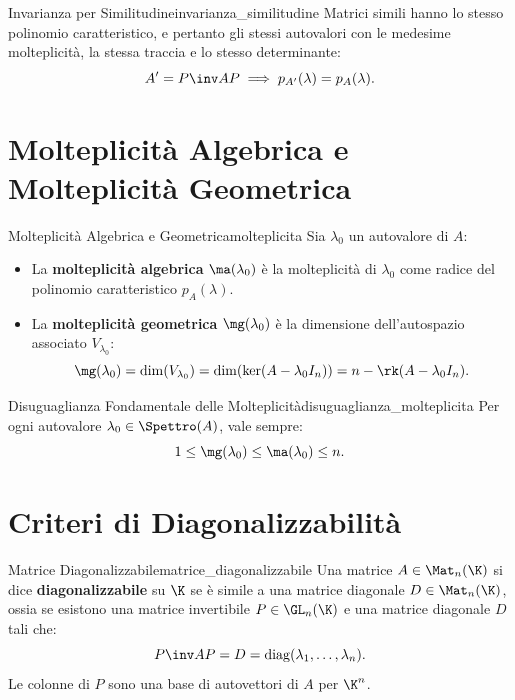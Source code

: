 \begin{proposizione}{Invarianza per Similitudine}{invarianza_similitudine}
Matrici simili hanno lo stesso polinomio caratteristico, e pertanto gli stessi autovalori con le medesime molteplicità, la stessa traccia e lo stesso determinante:
\begin{equation}
    A' = P\inv A P \implies p_{A'}(\lambda) = p_A(\lambda).
\end{equation}
\end{proposizione}

\section{Molteplicità Algebrica e Molteplicità Geometrica}

\begin{definizione}{Molteplicità Algebrica e Geometrica}{molteplicita}
Sia $\lambda_0$ un autovalore di $A$:
\begin{itemize}
    \item La \textbf{molteplicità algebrica} $\ma(\lambda_0)$ è la molteplicità di $\lambda_0$ come radice del polinomio caratteristico $p_A(\lambda)$.
    \item La \textbf{molteplicità geometrica} $\mg(\lambda_0)$ è la dimensione dell'autospazio associato $V_{\lambda_0}$:
    \begin{equation}
        \mg(\lambda_0) = \dim(V_{\lambda_0}) = \dim(\ker(A - \lambda_0 I_n)) = n - \rk(A - \lambda_0 I_n).
    \end{equation}
\end{itemize}
\end{definizione}

\begin{teorema}{Disuguaglianza Fondamentale delle Molteplicità}{disuguaglianza_molteplicita}
Per ogni autovalore $\lambda_0 \in \Spettro(A)$, vale sempre:
\begin{equation}
    1 \le \mg(\lambda_0) \le \ma(\lambda_0) \le n.
\end{equation}
\end{teorema}

\section{Criteri di Diagonalizzabilità}

\begin{definizione}{Matrice Diagonalizzabile}{matrice_diagonalizzabile}
Una matrice $A \in \Mat_n(\K)$ si dice \textbf{diagonalizzabile} su $\K$ se è simile a una matrice diagonale $D \in \Mat_n(\K)$, ossia se esistono una matrice invertibile $P \in \GL_n(\K)$ e una matrice diagonale $D$ tali che:
\begin{equation}
    P\inv A P = D = \operatorname{diag}(\lambda_1, \dots, \lambda_n).
\end{equation}
Le colonne di $P$ sono una base di autovettori di $A$ per $\K^n$.
\end{definizione}

